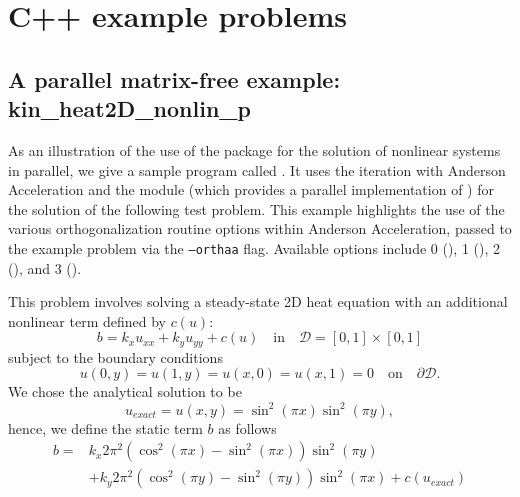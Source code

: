 \section{C++ example problems}\label{s:ex_cpp}

\subsection{A parallel matrix-free example: kin\_heat2D\_nonlin\_p}\label{ss:kin_heat2D_nonlin_p}

As an illustration of the use of the {\kinsol} package for the
solution of nonlinear systems in parallel, 
we give a sample program called .
It uses the {\kinsol}  iteration with Anderson Acceleration
and the {\nvecp} module (which provides a parallel implementation of {\nvector})
for the solution of the following test problem.
This example highlights the use of the various orthogonalization routine
options within Anderson Acceleration, passed to the example problem
via the \texttt{--orthaa} flag. Available options include 0 (),
1 (), 2 (), and 3 ().

This problem involves solving a steady-state 2D heat equation with an additional
nonlinear term defined by $c(u)$:
\begin{equation}
    b = k_x u_{xx} + k_y u_{yy} + c(u) \quad \text{in} \quad \mathcal{D}
        = [0,1] \times [0,1]
\end{equation}
subject to the boundary conditions
\begin{equation}
    u(0,y) = u(1,y) = u(x,0) = u(x,1) = 0 \quad \text{on} \quad \partial \mathcal{D}.
\end{equation}
We chose the analytical solution to be
\begin{equation}
    u_{exact} = u(x,y) = \sin^2(\pi x) \sin^2(\pi y),
\end{equation}
hence, we define the static term $b$ as follows
\begin{equation}
\begin{aligned}
    b = &k_x 2 \pi^2 (\cos^2(\pi x) - \sin^2(\pi x)) \sin^2(\pi y) \\
        &+ k_y 2 \pi^2 (\cos^2(\pi y) - \sin^2(\pi y)) \sin^2(\pi x) + c(u_{exact})
\end{aligned}
\end{equation}

